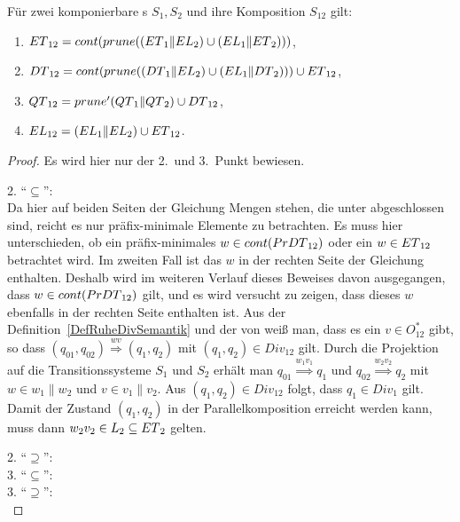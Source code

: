 \begin{satz}
  Für zwei komponierbare \EIO{}s $S_1, S_2$ und ihre Komposition
  $S_{12}$ gilt:
  \begin{enumerate}
    \item $ET{}_{12}=cont (prune ((ET{}_1\|EL{}_2)\cup
      (EL{}_1\|ET{}_2)))$,
    \item $DT{}_{12}=cont (prune ((DT{}_1\|EL{}_2)\cup
      (EL{}_1\|DT{}_2)))\cup ET{}_{12}$,
    \item $QT{}_{12}=prune' (QT{}_1\|QT{}_2)\cup DT{}_{12}$,
    \item $EL{}_{12}=(EL{}_1\|EL{}_2)\cup ET{}_{12}$.
  \end{enumerate}
\end{satz}

\begin{proof} Es wird hier nur der 2.\ und 3.\ Punkt bewiesen.

  2. ``$\subseteq$'':\\
  Da hier auf beiden Seiten der Gleichung Mengen stehen, die unter \cont{}
  abgeschlossen sind, reicht es nur präfix-minimale Elemente zu betrachten. Es
  muss hier unterschieden, ob ein präfix-minimales $w\in cont{}(PrDT{}_{12})$
  oder ein $w\in ET{}_{12}$ betrachtet wird. Im zweiten Fall ist das $w$ in
  der rechten Seite der Gleichung enthalten. Deshalb wird im weiteren Verlauf
  dieses Beweises davon ausgegangen, dass $w\in cont{}(PrDT{}_{12})$ gilt,
  und es wird versucht zu zeigen, dass dieses $w$ ebenfalls in der rechten
  Seite enthalten ist. Aus der Definition~\ref{DefRuheDivSemantik} und der von
  \prune{} weiß man, dass es ein $v\in O^*_{12}$ gibt, so dass $(q_{01},q_{02})
  \overset{wv}{\Rightarrow} (q_1,q_2)$ mit $(q_1,q_2)\in Div_{12}$ gilt. Durch
  die Projektion auf die Transitionssysteme $S_1$ und $S_2$ erhält man $q_{01}
  \overset{w_1v_1}{\Rightarrow} q_1$ und $q_{02} \overset{w_2v_2}{\Rightarrow}
  q_2$ mit $w\in w_1\|w_2$ und $v\in v_1\|v_2$. Aus $(q_1,q_2)\in Div_{12}$
  folgt, dass \oBdA{} $q_1\in Div_1$ gilt. Damit der Zustand $(q_1,q_2)$ in der
  Parallelkomposition erreicht werden kann, muss dann $w_2v_2\in L_2\subseteq
  ET{}_2$ gelten.

  2. ``$\supseteq$'':\\%

  3. ``$\subseteq$'':\\%

  3. ``$\supseteq$'':\\%
\end{proof}
